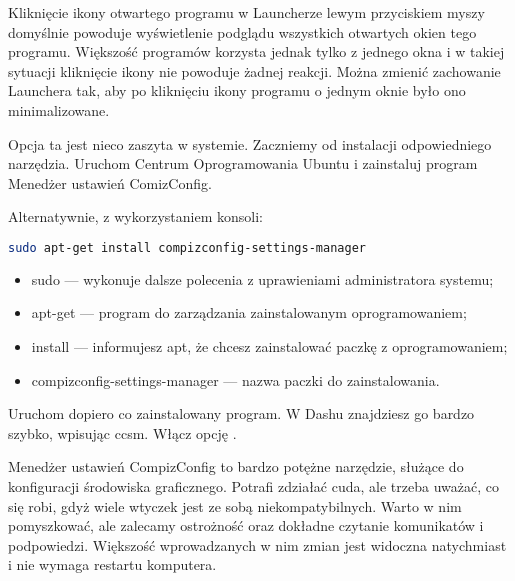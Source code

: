 Kliknięcie ikony otwartego programu w Launcherze lewym przyciskiem myszy domyślnie powoduje wyświetlenie podglądu wszystkich otwartych okien tego programu. Większość programów korzysta jednak tylko z jednego okna i w takiej sytuacji kliknięcie ikony nie powoduje żadnej reakcji. Można zmienić zachowanie Launchera tak, aby po kliknięciu ikony programu o jednym oknie było ono minimalizowane.

Opcja ta jest nieco zaszyta w systemie. Zaczniemy od instalacji odpowiedniego narzędzia. Uruchom \textcolor{ubuntu_orange}{Centrum Oprogramowania Ubuntu} i zainstaluj program \textcolor{ubuntu_orange}{Menedżer ustawień ComizConfig}.

Alternatywnie, z wykorzystaniem konsoli:
\begin{lstlisting}[language=bash]
sudo apt-get install compizconfig-settings-manager
\end{lstlisting}
\begin{itemize}
\item \textcolor{ubuntu_orange}{sudo} --- wykonuje dalsze polecenia z uprawieniami administratora systemu;
\item \textcolor{ubuntu_orange}{apt-get} --- program do zarządzania zainstalowanym oprogramowaniem;
\item \textcolor{ubuntu_orange}{install} --- informujesz apt, że chcesz zainstalować paczkę z oprogramowaniem;
\item \textcolor{ubuntu_orange}{compizconfig-settings-manager} --- nazwa paczki do zainstalowania.
\end{itemize}
Uruchom dopiero co zainstalowany program. W Dashu znajdziesz go bardzo szybko, wpisując \textcolor{ubuntu_orange}{ccsm}. Włącz opcję .

Menedżer ustawień CompizConfig to bardzo potężne narzędzie, służące do konfiguracji środowiska graficznego. Potrafi zdziałać cuda, ale trzeba uważać, co się robi, gdyż wiele wtyczek jest ze sobą niekompatybilnych. Warto w nim pomyszkować, ale zalecamy ostrożność oraz dokładne czytanie komunikatów i podpowiedzi. Większość wprowadzanych w nim zmian jest widoczna natychmiast i nie wymaga restartu komputera.
